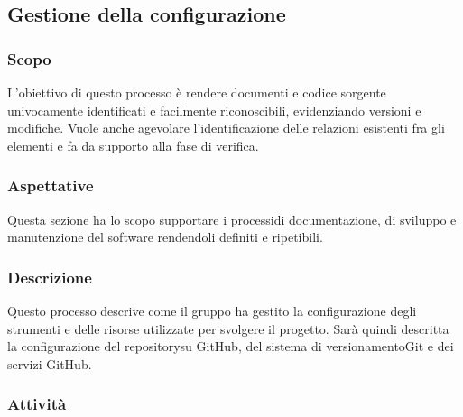 \subsection{Gestione della configurazione}
	\subsubsection{Scopo}
		L'obiettivo di questo processo è rendere documenti e codice sorgente univocamente identificati e facilmente riconoscibili, evidenziando versioni e modifiche. Vuole anche agevolare l'identificazione delle relazioni esistenti fra gli elementi e fa da supporto alla fase di verifica.
	\subsubsection{Aspettative}
		Questa sezione ha lo scopo supportare i processi\glosp di documentazione, di sviluppo e manutenzione del software rendendoli definiti e ripetibili.  
	\subsubsection{Descrizione} 
		Questo processo descrive come il gruppo ha gestito la configurazione degli strumenti e delle risorse utilizzate per svolgere il progetto\glo.
		Sarà quindi descritta la configurazione del repository\glosp su GitHub, del sistema di versionamento\glosp Git e dei servizi GitHub.
	\subsubsection{Attività}
